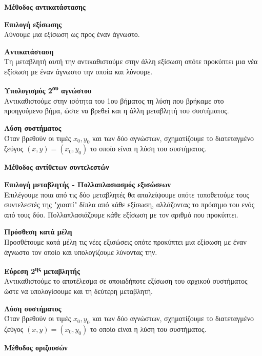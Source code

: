 \documentclass[twoside,nofonts,internet,math,spyros]{frontisthrio}
\newcommand{\tss}[1]{\textsuperscript{#1}}
\begin{document}
\begin{arithmisi}
\item\textbf{Μέθοδος αντικατάστασης}
\begin{bhma}
\item \textbf{Επιλογή εξίσωσης}\\
Λύνουμε μια εξίσωση ως προς έναν άγνωστο.
\item \textbf{Αντικατάσταση}\\
Τη μεταβλητή αυτή την αντικαθιστούμε στην άλλη εξίσωση οπότε προκύπτει μια νέα εξίσωση με έναν άγνωστο την οποία και λύνουμε.
\item \textbf{Υπολογισμός 2\tss{ου} αγνώστου}\\
Αντικαθιστούμε στην ισότητα του 1ου βήματος τη λύση που βρήκαμε στο προηγούμενο βήμα, ώστε να βρεθεί και η άλλη μεταβλητή του συστήματος.
\item \textbf{Λύση συστήματος}\\
Όταν βρεθούν οι τιμές $ x_0,y_0 $ και των δύο αγνώστων, σχηματίζουμε το διατεταγμένο ζεύγος $ (x,y)=(x_0,y_0) $ το οποίο είναι η λύση του συστήματος.
\end{bhma}
\item\textbf{Μέθοδος αντίθετων συντελεστών}
\begin{bhma}
\item \textbf{Επιλογή μεταβλητής - Πολλαπλασιασμός εξισώσεων}\\
Επιλέγουμε ποια από τις δύο μεταβλητές θα απαλείψουμε οπότε τοποθετούμε τους συντελεστές της "χιαστί" δίπλα από κάθε εξίσωση, αλλάζοντας το πρόσημο του ενός από τους δύο. Πολλαπλασιάζουμε κάθε εξίσωση με τον αριθμό που προκύπτει.
\item \textbf{Πρόσθεση κατά μέλη}\\
Προσθέτουμε κατά μέλη τις νέες εξισώσεις οπότε προκύπτει μια εξίσωση με έναν άγνωστο τον οποίο και υπολογίζουμε λύνοντας την.
\item \textbf{Εύρεση 2\tss{ης} μεταβλητής}\\
Αντικαθιστούμε το αποτέλεσμα σε οποιαδήποτε εξίσωση του αρχικού συστήματος ώστε να υπολογίσουμε και τη δεύτερη μεταβλητή.
\item \textbf{Λύση συστήματος}\\
Όταν βρεθούν οι τιμές $ x_0,y_0 $ και των δύο αγνώστων, σχηματίζουμε το διατεταγμένο ζεύγος $ (x,y)=(x_0,y_0) $ το οποίο είναι η λύση του συστήματος.
\end{bhma}
\item\textbf{Μέθοδος οριζουσών}
\begin{bhma}

\end{bhma}
\end{arithmisi}
\end{document}
